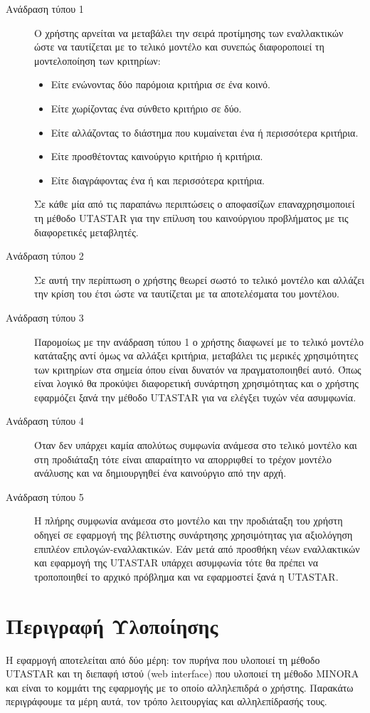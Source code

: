\documentclass[11pt,a4paper,titlepage]{article}
\numberwithin{equation}{section}
\begin{document}
\begin{description}
	\item[Ανάδραση τύπου 1]
	Ο χρήστης αρνείται να μεταβάλει την σειρά προτίμησης των εναλλακτικών ώστε να ταυτίζεται με το τελικό μοντέλο και συνεπώς διαφοροποιεί τη μοντελοποίηση των κριτηρίων:
	\begin{itemize}
		\item Είτε ενώνοντας δύο παρόμοια κριτήρια σε ένα κοινό.
		\item Είτε χωρίζοντας ένα σύνθετο κριτήριο σε δύο.
		\item Είτε αλλάζοντας το διάστημα που κυμαίνεται ένα ή περισσότερα κριτήρια.
		\item Είτε προσθέτοντας καινούργιο κριτήριο ή κριτήρια.
		\item Είτε διαγράφοντας ένα ή και περισσότερα κριτήρια.
	\end{itemize}
	Σε κάθε μία από τις παραπάνω περιπτώσεις ο αποφασίζων επαναχρησιμοποιεί τη μέθοδο UTASTAR για την επίλυση του καινούργιου προβλήματος με τις διαφορετικές μεταβλητές.
	\item[Ανάδραση τύπου 2]
	Σε αυτή την περίπτωση ο χρήστης θεωρεί σωστό το τελικό μοντέλο και αλλάζει την κρίση του έτσι ώστε να ταυτίζεται με τα αποτελέσματα του μοντέλου.	
	\item[Ανάδραση τύπου 3]
	Παρομοίως με την ανάδραση τύπου 1 ο χρήστης διαφωνεί με το τελικό μοντέλο κατάταξης αντί όμως να αλλάξει κριτήρια, μεταβάλει τις μερικές χρησιμότητες των κριτηρίων στα σημεία όπου είναι δυνατόν να πραγματοποιηθεί αυτό. Όπως είναι λογικό θα προκύψει διαφορετική συνάρτηση χρησιμότητας και ο χρήστης εφαρμόζει ξανά την μέθοδο UTASTAR για να ελέγξει τυχών νέα ασυμφωνία.   
	\item[Ανάδραση τύπου 4]
	Όταν δεν υπάρχει καμία απολύτως συμφωνία ανάμεσα στο τελικό μοντέλο και στη προδιάταξη τότε είναι απαραίτητο να απορριφθεί το τρέχον μοντέλο ανάλυσης και να δημιουργηθεί ένα καινούργιο από την αρχή.
	\item[Ανάδραση τύπου 5]
	Η πλήρης συμφωνία ανάμεσα στο μοντέλο και την προδιάταξη του χρήστη οδηγεί σε εφαρμογή της βέλτιστης συνάρτησης χρησιμότητας για αξιολόγηση επιπλέον επιλογών-εναλλακτικών. Εάν μετά από προσθήκη νέων εναλλακτικών και εφαρμογή της UTASTAR υπάρχει ασυμφωνία τότε θα πρέπει να τροποποιηθεί το αρχικό πρόβλημα και να εφαρμοστεί ξανά η UTASTAR.
\end{description}

\section{Περιγραφή Υλοποίησης}
\label{sec:implementation}
Η εφαρμογή αποτελείται από δύο μέρη: τον πυρήνα που υλοποιεί τη μέθοδο UTASTAR και τη διεπαφή ιστού (web interface) που υλοποιεί τη μέθοδο MINORA και είναι το κομμάτι της εφαρμογής με το οποίο αλληλεπιδρά ο χρήστης. Παρακάτω περιγράφουμε τα μέρη αυτά, τον τρόπο λειτουργίας και αλληλεπίδρασής τους.
\end{document}
